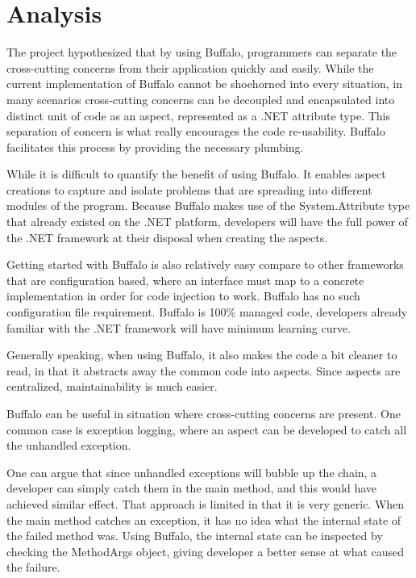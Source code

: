 \chapter{Analysis}

The project hypothesized that by using Buffalo, programmers can separate the cross-cutting concerns from their application quickly and easily. While the current implementation of Buffalo cannot be shoehorned into every situation, in many scenarios cross-cutting concerns can be decoupled and encapsulated into distinct unit of code as an aspect, represented as a .NET attribute type. This separation of concern is what really encourages the code re-usability. Buffalo facilitates this process by providing the necessary plumbing. 

While it is difficult to quantify the benefit of using Buffalo. It enables aspect creations to capture and isolate problems that are spreading into different modules of the program. Because Buffalo makes use of the System.Attribute type that already existed on the .NET platform, developers will have the full power of the .NET framework at their disposal when creating the aspects. 

Getting started with Buffalo is also relatively easy compare to other frameworks that are configuration based, where an interface must map to a concrete implementation in order for code injection to work. Buffalo has no such configuration file requirement. Buffalo is 100\% managed code, developers already familiar with the .NET framework will have minimum learning curve.

Generally speaking, when using Buffalo, it also makes the code a bit cleaner to read, in that it abstracts away the common code into aspects. Since aspects are centralized, maintainability is much easier. 

Buffalo can be useful in situation where cross-cutting concerns are present. One common case is exception logging, where an aspect can be developed to catch all the unhandled exception.

One can argue that since unhandled exceptions will bubble up the chain, a developer can simply catch them in the main method, and this would have achieved similar effect. That approach is limited in that it is very generic. When the main method catches an exception, it has no idea what the internal state of the failed method was. Using Buffalo, the internal state can be inspected by checking the MethodArgs object, giving developer a better sense at what caused the failure.

